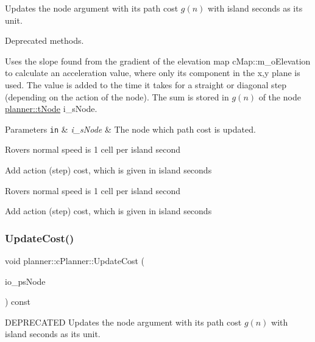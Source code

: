 Updates the node argument with its path cost $g(n)$ with island seconds as its unit. 

Deprecated methods.

Uses the slope found from the gradient of the elevation map c\+Map\+::m\+\_\+o\+Elevation to calculate an acceleration value, where only its component in the x,y plane is used. The value is added to the time it takes for a straight or diagonal step (depending on the action of the node). The sum is stored in $g(n)$ of the node \mbox{\hyperlink{structplanner_1_1t_node}{planner\+::t\+Node}} i\+\_\+s\+Node. 
\begin{DoxyParams}[1]{Parameters}
\mbox{\tt in}  & {\em i\+\_\+s\+Node} & The node which path cost is updated. \\
\hline
\end{DoxyParams}
Rover\textquotesingle{}s normal speed is 1 cell per island second

Add action (step) cost, which is given in island seconds

Rover\textquotesingle{}s normal speed is 1 cell per island second

Add action (step) cost, which is given in island seconds \mbox{\label{classplanner_1_1c_planner_a16e8c156297fff49a6ba9b97073baffb}} 
\subsubsection{\texorpdfstring{Update\+Cost()}{UpdateCost()}\hspace{0.1cm}{\footnotesize\ttfamily [2/2]}}
{\footnotesize\ttfamily void planner\+::c\+Planner\+::\+Update\+Cost (\begin{DoxyParamCaption}\item[{std\+::shared\+\_\+ptr$<$ \mbox{\hyperlink{structplanner_1_1t_node}{t\+Node}} $>$}]{io\+\_\+ps\+Node }\end{DoxyParamCaption}) const}



D\+E\+P\+R\+E\+C\+A\+T\+ED Updates the node argument with its path cost $g(n)$ with island seconds as its unit. 

